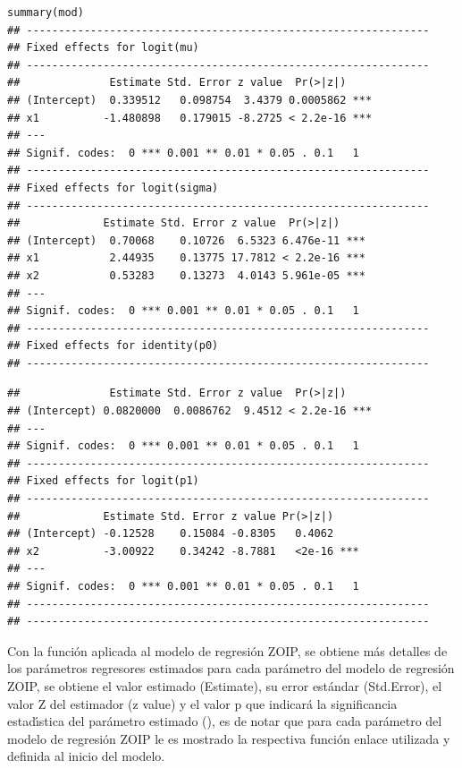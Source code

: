 \begin{verbatim}
summary(mod)
## ---------------------------------------------------------------
## Fixed effects for logit(mu) 
## ---------------------------------------------------------------
##              Estimate Std. Error z value  Pr(>|z|)    
## (Intercept)  0.339512   0.098754  3.4379 0.0005862 ***
## x1          -1.480898   0.179015 -8.2725 < 2.2e-16 ***
## ---
## Signif. codes:  0 *** 0.001 ** 0.01 * 0.05 . 0.1   1
## ---------------------------------------------------------------
## Fixed effects for logit(sigma) 
## ---------------------------------------------------------------
##             Estimate Std. Error z value  Pr(>|z|)    
## (Intercept)  0.70068    0.10726  6.5323 6.476e-11 ***
## x1           2.44935    0.13775 17.7812 < 2.2e-16 ***
## x2           0.53283    0.13273  4.0143 5.961e-05 ***
## ---
## Signif. codes:  0 *** 0.001 ** 0.01 * 0.05 . 0.1   1
## ---------------------------------------------------------------
## Fixed effects for identity(p0) 
## ---------------------------------------------------------------
\end{verbatim}
\begin{verbatim}
##              Estimate Std. Error z value  Pr(>|z|)    
## (Intercept) 0.0820000  0.0086762  9.4512 < 2.2e-16 ***
## ---
## Signif. codes:  0 *** 0.001 ** 0.01 * 0.05 . 0.1   1
## ---------------------------------------------------------------
## Fixed effects for logit(p1) 
## ---------------------------------------------------------------
##             Estimate Std. Error z value Pr(>|z|)    
## (Intercept) -0.12528    0.15084 -0.8305   0.4062    
## x2          -3.00922    0.34242 -8.7881   <2e-16 ***
## ---
## Signif. codes:  0 *** 0.001 ** 0.01 * 0.05 . 0.1   1
## ---------------------------------------------------------------
## ---------------------------------------------------------------
\end{verbatim}

Con la funci\'{o}n  aplicada al modelo de regresi\'{o}n ZOIP, se obtiene m\'{a}s detalles de los par\'{a}metros regresores estimados para cada par\'{a}metro del modelo de regresi\'{o}n ZOIP, se obtiene el valor estimado (Estimate), su error est\'{a}ndar (Std.Error), el valor Z del estimador (z value) y el valor p que indicar\'{a} la significancia estad\'{\i}stica del par\'{a}metro estimado (), es de notar que para cada par\'{a}metro del modelo de regresi\'{o}n ZOIP le es mostrado la respectiva funci\'{o}n enlace utilizada y definida al inicio del modelo.

